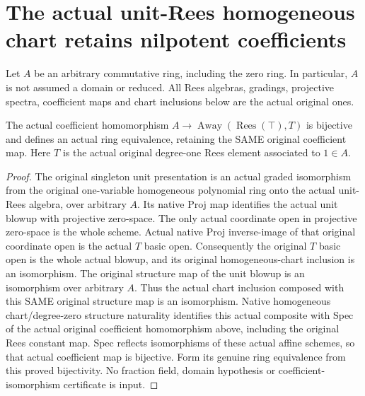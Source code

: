 \section{The actual unit-Rees homogeneous chart retains nilpotent coefficients}

Let $A$ be an arbitrary commutative ring, including the zero ring. In particular,
$A$ is not assumed a domain or reduced. All Rees algebras, gradings, projective
spectra, coefficient maps and chart inclusions below are the actual original ones.

\begin{lemma}
\label{lem:central-embedding-generic-unit-rees-homogeneous-coefficient-equiv}
\leanok
The actual coefficient homomorphism
$A\to\operatorname{Away}(\operatorname{Rees}(\top),T)$ is bijective and defines
an actual ring equivalence, retaining the SAME original coefficient map.
Here $T$ is the actual original degree-one Rees element associated to $1\in A$.
\end{lemma}
\begin{proof}
The original singleton unit presentation is an actual graded isomorphism from
the original one-variable homogeneous polynomial ring onto the actual unit-Rees
algebra, over arbitrary $A$. Its native Proj map identifies the actual unit
blowup with projective zero-space. The only actual coordinate open in projective
zero-space is the whole scheme. Actual native Proj inverse-image of that original
coordinate open is the actual $T$ basic open. Consequently the original $T$
basic open is the whole actual blowup, and its original homogeneous-chart
inclusion is an isomorphism.
The original structure map of the unit blowup is an isomorphism over arbitrary
$A$. Thus the actual chart inclusion composed with this SAME original structure
map is an isomorphism. Native homogeneous chart/degree-zero structure naturality
identifies this actual composite with Spec of the actual original coefficient
homomorphism above, including the original Rees constant map. Spec reflects
isomorphisms of these actual affine schemes, so that actual coefficient map is
bijective. Form its genuine ring equivalence from this proved bijectivity.
No fraction field, domain hypothesis or coefficient-isomorphism certificate is input.
\end{proof}

